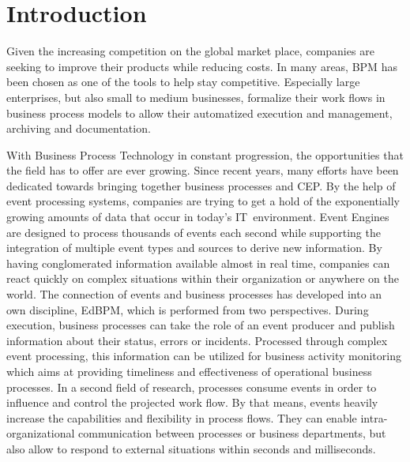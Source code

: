 \chapter{Introduction}

Given the increasing competition on the global market place, companies are seeking to improve their products while reducing costs.
In many areas, \ac{BPM} has been chosen as one of the tools to help stay competitive.
Especially large enterprises, but also small to medium businesses, formalize their work flows in business process models to allow their automatized execution and management, archiving and documentation.


With Business Process Technology in constant progression, the opportunities that the field has to offer are ever growing.
Since recent years, many efforts have been dedicated towards bringing together business processes and \ac{CEP}.
By the help of event processing systems, companies are trying to get a hold of the exponentially growing amounts of data that occur in today's IT~environment.
Event Engines are designed to process thousands of events each second while supporting the integration of multiple event types and sources to derive new information.
By having conglomerated information available almost in real time, companies can react quickly on complex situations within their organization or anywhere on the world.
The connection of events and business processes has developed into an own discipline, \acl{EdBPM}, which is performed from two perspectives.
During execution, business processes can take the role of an event producer and publish information about their status, errors or incidents. 
Processed through complex event processing, this information can be utilized for business activity monitoring which aims at providing timeliness and effectiveness of operational business processes.
In a second field of research, processes consume events in order to influence and control the projected work flow.
By that means, events heavily increase the capabilities and flexibility in process flows. They can enable intra-organizational communication between processes or business departments, but also allow to respond to external situations within seconds and milliseconds.

